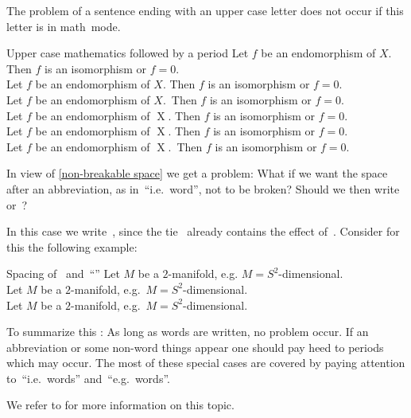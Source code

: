 The problem of a sentence ending with an upper case letter does not occur if this letter is in math~mode.
\begin{showlatex}{Upper case mathematics followed by a period}
Let $f$ be an endomorphism of $X$.
Then $f$ is an isomorphism or $f = 0$.\\
Let $f$ be an endomorphism of $X$\@.
Then $f$ is an isomorphism or $f = 0$.\\
Let $f$ be an endomorphism of $X$.\ 
Then $f$ is an isomorphism or $f = 0$.
\\
Let $f$ be an endomorphism of $\operatorname{X}$.
Then $f$ is an isomorphism or $f = 0$.\\
Let $f$ be an endomorphism of $\operatorname{X}$\@.
Then $f$ is an isomorphism or $f = 0$.\\
Let $f$ be an endomorphism of $\operatorname{X}$.\ 
Then $f$ is an isomorphism or $f = 0$.
\end{showlatex}

In view of \cref{non-breakable space} we get a problem:
What if we want the space after an abbreviation, as in~\enquote{i.e.~word}, not to be broken?
Should we then write~\inlinecode{i.e.{\tbs} word} or~?

In this case we write~\inlinecode{i.e.{\customtexttilde}word}, since the tie~\inlinecode{\customtexttilde} already contains the effect of~.
Consider for this the following example:
\begin{showlatex}{Spacing of~\inlinecode{\customtexttilde} and~\enquote{\inlinecode{{\tbs} }}}
Let $M$ be a $2$-manifold, e.g. $M = S^2$-dimensional. \\
Let $M$ be a $2$-manifold, e.g.\ $M = S^2$-dimensional. \\
Let $M$ be a $2$-manifold, e.g.~$M = S^2$-dimensional.
\end{showlatex}

To summarize this :
As long as words are written, no problem occur.
If an abbreviation or some non-word things appear one should pay heed to periods which may occur.
The most of these special cases are covered by paying attention to~\enquote{i.e.~words} and~\enquote{e.g.~words}.

We refer to \cite[19.5.1, 19.6]{latex2e_manual} for more information on this topic.

\index{spacing!after a period|)}





